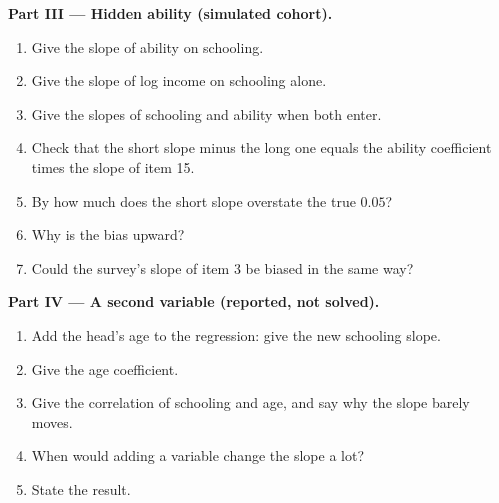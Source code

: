 \begin{problem}
\medskip\noindent\textbf{Part III --- Hidden ability (simulated cohort).}
\begin{enumerate}[resume]
  \item Give the slope of ability on schooling.
  \item Give the slope of log income on schooling alone.
  \item Give the slopes of schooling and ability when both enter.
  \item Check that the short slope minus the long one equals the ability
    coefficient times the slope of item 15.
  \item By how much does the short slope overstate the true $0.05$?
  \item Why is the bias upward?
  \item Could the survey's slope of item 3 be biased in the same way?
\end{enumerate}

\medskip\noindent\textbf{Part IV --- A second variable (reported, not solved).}
\begin{enumerate}[resume]
  \item Add the head's age to the regression: give the new schooling slope.
  \item Give the age coefficient.
  \item Give the correlation of schooling and age, and say why the slope
    barely moves.
  \item When would adding a variable change the slope a lot?
  \item State the result.
\end{enumerate}
\end{problem}
